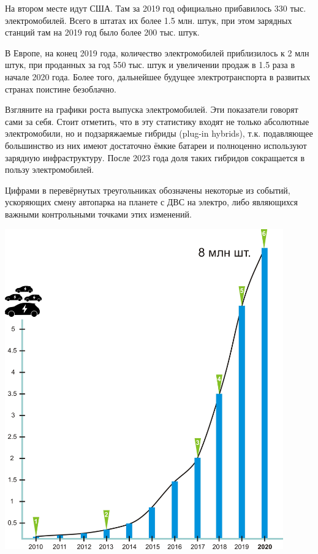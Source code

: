 \documentclass[a4paper,12pt]{report}
\begin{document}
На втором месте идут США. Там за 2019 год официально прибавилось 330 тыс. электромобилей. Всего в штатах их более 1.5 млн. штук, при этом зарядных станций там на 2019 год было более 200 тыс. штук.

В Европе, на конец 2019 года, количество электромобилей приблизилось к 2 млн штук, при проданных за год 550 тыс. штук и увеличении продаж в 1.5 раза в начале 2020 года.
Более того, дальнейшее будущее электротранспорта в развитых странах поистине безоблачно. 

Взгляните на графики роста выпуска электромобилей. Эти показатели говорят сами за себя. Стоит отметить, что в эту статистику входят не только абсолютные электромобили, но и подзаряжаемые гибриды (plug-in hybrids), т.к. подавляющее большинство из них имеют достаточно ёмкие батареи и полноценно используют зарядную инфраструктуру.
После 2023 года доля таких гибридов сокращается в пользу электромобилей.

Цифрами в перевёрнутых треугольниках обозначены некоторые из событий, ускоряющих смену автопарка на планете с ДВС на электро, либо являющихся важными контрольными точками этих изменений.

\vspace*{1cm}
\includegraphics[width=12cm]{chart1}
\vspace*{1cm}
\end{document}

